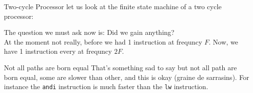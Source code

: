 \begin{parag}{Two-cycle Processor}
    let us look at the finite state machine of a two cycle processor:
	\begin{center}
	    
	
\end{center}
The question we must ask now is: Did we gain anything?\\
At the moment not really, before we had 1 instruction  at frequncy $F$. Now, we have 1 instruction every  at frequncy $2F$.
\end{parag}
\begin{parag}{Not all paths are born equal}
    That's something sad to say but not all path are born equal, some are slower than other, and this is okay (graine de sarrasins). For instance the \texttt{andi} instruction is much faster than the \texttt{lw} instruction.
\end{parag}

